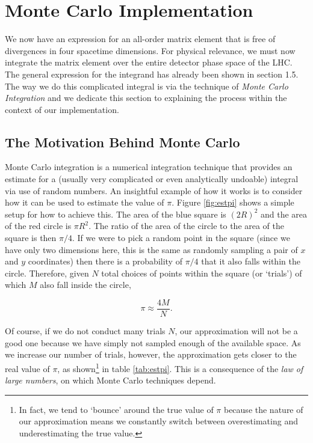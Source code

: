 \section{Monte Carlo Implementation}

We now have an expression for an all-order matrix element that is free of divergences in four spacetime dimensions. For physical relevance, we must now integrate the matrix element over the entire detector phase space of the LHC. The general expression for the integrand has already been shown in section 1.5. The way we do this complicated integral is via the technique of \emph{Monte Carlo Integration} and we dedicate this section to explaining the process within the context of our implementation.

\subsection{The Motivation Behind Monte Carlo}
Monte Carlo integration is a numerical integration technique that provides an estimate for a (usually very complicated or even analytically undoable) integral via use of random numbers. An insightful example of how it works is to consider how it can be used to estimate the value of $\pi$. Figure \ref{fig:estpi} shows a simple setup for how to achieve this. The area of the blue square is $(2R)^2$ and the area of the red circle is $\pi R^2$. The ratio of the area of the circle to the area of the square is then $\pi/4$. If we were to pick a random point in the square (since we have only two dimensions here, this is the same as randomly sampling a pair of $x$ and $y$ coordinates) then there is a probability of $\pi/4$ that it also falls within the circle. Therefore, given $N$ total choices of points within the square (or `trials') of which $M$ also fall inside the circle,

\begin{equation}
\pi \approx \frac{4M}{N}.
\end{equation} 

Of course, if we do not conduct many trials $N$, our approximation will not be a good one because we have simply not sampled enough of the available space. As we increase our number of trials, however, the approximation gets closer to the real value of $\pi$, as shown\footnote{In fact, we tend to `bounce' around the true value of $\pi$ because the nature of our approximation means we constantly switch between overestimating and underestimating the true value.} in table \ref{tab:estpi}. This is a consequence of the \emph{law of large numbers}, on which Monte Carlo techniques depend. 

